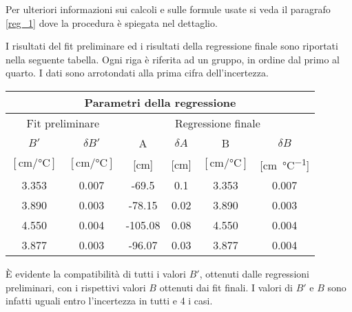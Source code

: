 Per ulteriori informazioni sui calcoli e sulle formule usate si veda il paragrafo \ref{reg_1} dove la procedura è spiegata
nel dettaglio.

I risultati del fit preliminare ed i risultati della regressione finale sono riportati nella seguente tabella.
Ogni riga è riferita ad un gruppo, in ordine dal primo al quarto. I dati sono arrotondati alla prima cifra dell'incertezza.

\begin{center}
    \small
    \begin{tabular}{c c | c c c c}
        \multicolumn{6}{c}{\textbf{Parametri della regressione}} \\
        \toprule
        \multicolumn{2}{c|}{Fit preliminare} & \multicolumn{4}{c}{Regressione finale} \\
        \midrule
        $B'$ & $\delta B'$ & A & $\delta A$ & B & $\delta B$ \\
        $[\si{\centi\meter\per\celsius}]$ & $[\si{\centi\meter\per\celsius}]$ &
        [cm] & [cm] & $[\si{\centi\meter\per\celsius}]$ & [\si{\centi\metre\per\celsius}] \\
        \midrule
        3.353 & 0.007 & -69.5  & 0.1 & 3.353 & 0.007 \\
        3.890 & 0.003 & -78.15  & 0.02 & 3.890 & 0.003 \\
        4.550 & 0.004 & -105.08 & 0.08 & 4.550 & 0.004 \\
        3.877 & 0.003 & -96.07  & 0.03 & 3.877 & 0.004 \\
        \bottomrule
    \end{tabular}
\end{center}

È evidente la compatibilità di tutti i valori $B'$, ottenuti dalle regressioni preliminari, con i rispettivi valori $B$ ottenuti dai
fit finali. I valori di $B'$ e $B$ sono infatti uguali entro l'incertezza in tutti e 4 i casi.
